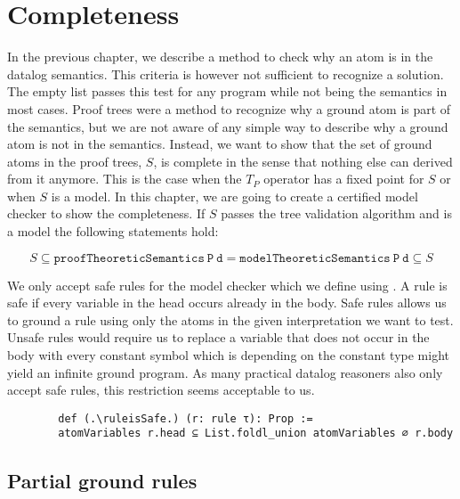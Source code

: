 \chapter{Completeness}\label{sec:completeness}

    In the previous chapter, we describe a method to check why an atom is in the datalog semantics. This criteria is however not sufficient to recognize a solution. The empty list passes this test for any program while not being the semantics in most cases. Proof trees were a method to recognize why a ground atom is part of the semantics, but we are not aware of any simple way to describe why a ground atom is not in the semantics. Instead, we want to show that the set of ground atoms in the proof trees, $S$,  is complete in the sense that nothing else can derived from it anymore. This is the case when the $T_P$ operator has a fixed point for $S$ or when $S$ is a model. In this chapter, we are going to create a certified model checker to show the completeness. If $S$ passes the tree validation algorithm and is a model the following statements hold:

    \[ S \subseteq \mathtt{proofTheoreticSemantics\ P\ d} = \mathtt{modelTheoreticSemantics\ P\ d} \subseteq S \]

    We only accept safe rules for the model checker which we define using \atomVariables. A rule is safe if every variable in the head occurs already in the body. Safe rules allows us to ground a rule using only the atoms in the given interpretation we want to test. Unsafe rules would require us to replace a variable that does not occur in the body with every constant symbol which is depending on the constant type might yield an infinite ground program. As many practical datalog reasoners also only accept safe rules, this restriction seems acceptable to us.

    \begin{lstlisting}
        def (.\ruleisSafe.) (r: rule τ): Prop := 
        atomVariables r.head ⊆ List.foldl_union atomVariables ∅ r.body

    \end{lstlisting}

    \section{Partial ground rules}
    
